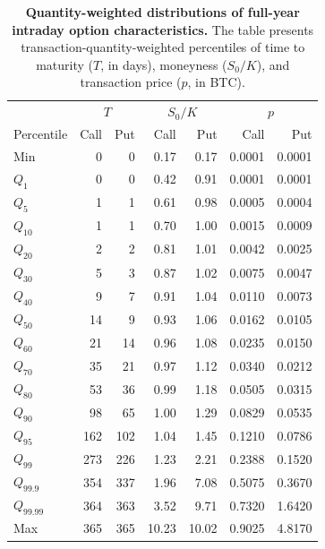 \documentclass[11pt]{article}
\begin{document}
\begin{table}[h]
\centering
\begin{tabular}{lrrrrrr}
\hline
 & \multicolumn{2}{c}{$T$} & \multicolumn{2}{c}{$S_0/K$} & \multicolumn{2}{c}{$p$} \\
 Percentile & Call & Put & Call & Put & Call & Put \\
\hline
Min & 0 & 0 & 0.17 & 0.17 & 0.0001 & 0.0001 \\
$Q_1$ & 0 & 0 & 0.42 & 0.91 & 0.0001 & 0.0001 \\
$Q_5$ & 1 & 1 & 0.61 & 0.98 & 0.0005 & 0.0004 \\
$Q_{10}$ & 1 & 1 & 0.70 & 1.00 & 0.0015 & 0.0009 \\
$Q_{20}$ & 2 & 2 & 0.81 & 1.01 & 0.0042 & 0.0025 \\
$Q_{30}$ & 5 & 3 & 0.87 & 1.02 & 0.0075 & 0.0047 \\
$Q_{40}$ & 9 & 7 & 0.91 & 1.04 & 0.0110 & 0.0073 \\
$Q_{50}$ & 14 & 9 & 0.93 & 1.06 & 0.0162 & 0.0105 \\
$Q_{60}$ & 21 & 14 & 0.96 & 1.08 & 0.0235 & 0.0150 \\
$Q_{70}$ & 35 & 21 & 0.97 & 1.12 & 0.0340 & 0.0212 \\
$Q_{80}$ & 53 & 36 & 0.99 & 1.18 & 0.0505 & 0.0315 \\
$Q_{90}$ & 98 & 65 & 1.00 & 1.29 & 0.0829 & 0.0535 \\
$Q_{95}$ & 162 & 102 & 1.04 & 1.45 & 0.1210 & 0.0786 \\
$Q_{99}$ & 273 & 226 & 1.23 & 2.21 & 0.2388 & 0.1520 \\
$Q_{99.9}$ & 354 & 337 & 1.96 & 7.08 & 0.5075 & 0.3670 \\
$Q_{99.99}$ & 364 & 363 & 3.52 & 9.71 & 0.7320 & 1.6420 \\
Max & 365 & 365 & 10.23 & 10.02 & 0.9025 & 4.8170 \\
\hline
\end{tabular}
\caption{\textbf{Quantity-weighted distributions of full-year intraday option characteristics.} The table presents transaction-quantity-weighted percentiles of time to maturity ($T$, in days), moneyness ($S_0/K$), and transaction price ($p$, in BTC).}
\label{tab:appendix_full_year_weighted_option_characteristics}
\end{table}



\clearpage
\end{document}
